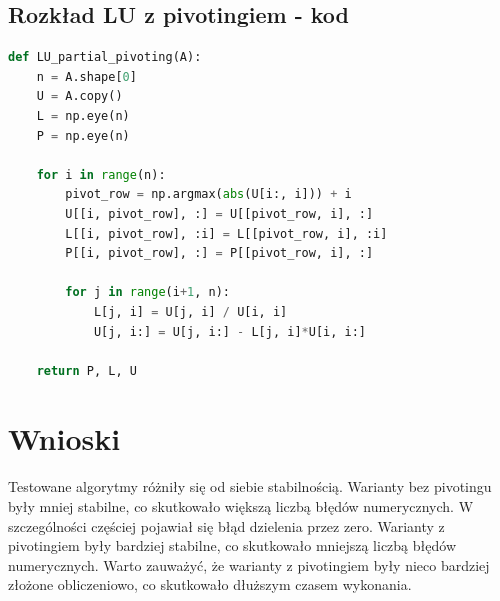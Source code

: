 \documentclass[a4paper]{article}
\begin{document}
\subsection{Rozkład LU z pivotingiem - kod}
\begin{lstlisting}[language=python]
def LU_partial_pivoting(A):
    n = A.shape[0]
    U = A.copy()
    L = np.eye(n)
    P = np.eye(n)

    for i in range(n):
        pivot_row = np.argmax(abs(U[i:, i])) + i
        U[[i, pivot_row], :] = U[[pivot_row, i], :]
        L[[i, pivot_row], :i] = L[[pivot_row, i], :i]
        P[[i, pivot_row], :] = P[[pivot_row, i], :]

        for j in range(i+1, n):
            L[j, i] = U[j, i] / U[i, i]
            U[j, i:] = U[j, i:] - L[j, i]*U[i, i:]

    return P, L, U

\end{lstlisting}

\section{Wnioski}

Testowane algorytmy różniły się od siebie stabilnością. Warianty bez pivotingu były mniej stabilne, co skutkowało większą liczbą błędów numerycznych.
 W szczególności częściej pojawiał się błąd dzielenia przez zero. Warianty z pivotingiem były bardziej stabilne, co skutkowało mniejszą liczbą błędów numerycznych.
Warto zauważyć, że warianty z pivotingiem były nieco bardziej złożone obliczeniowo, co skutkowało dłuższym czasem wykonania.
\end{document}
